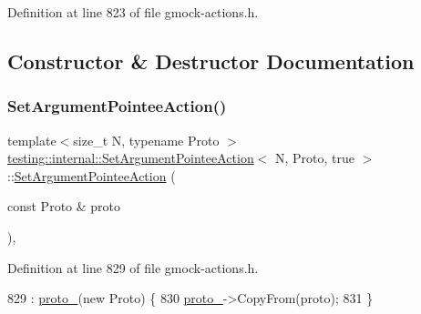 Definition at line 823 of file gmock-\/actions.\+h.



\subsection{Constructor \& Destructor Documentation}
\mbox{\label{classtesting_1_1internal_1_1SetArgumentPointeeAction_3_01N_00_01Proto_00_01true_01_4_af08b3a61e483f704e93872987d30ade0}} 
\subsubsection{\texorpdfstring{Set\+Argument\+Pointee\+Action()}{SetArgumentPointeeAction()}}
{\footnotesize\ttfamily template$<$size\+\_\+t N, typename Proto $>$ \\
\hyperlink{classtesting_1_1internal_1_1SetArgumentPointeeAction}{testing\+::internal\+::\+Set\+Argument\+Pointee\+Action}$<$ N, Proto, true $>$\+::\hyperlink{classtesting_1_1internal_1_1SetArgumentPointeeAction}{Set\+Argument\+Pointee\+Action} (\begin{DoxyParamCaption}\item[{const Proto \&}]{proto }\end{DoxyParamCaption})\hspace{0.3cm}{\ttfamily [inline]}, {\ttfamily [explicit]}}



Definition at line 829 of file gmock-\/actions.\+h.


\begin{DoxyCode}
829                                                         : \hyperlink{classtesting_1_1internal_1_1SetArgumentPointeeAction_3_01N_00_01Proto_00_01true_01_4_aef9287aad8516bfec6cbcf63807c6c87}{proto\_}(\textcolor{keyword}{new} Proto) \{
830     \hyperlink{classtesting_1_1internal_1_1SetArgumentPointeeAction_3_01N_00_01Proto_00_01true_01_4_aef9287aad8516bfec6cbcf63807c6c87}{proto\_}->CopyFrom(proto);
831   \}
\end{DoxyCode}


